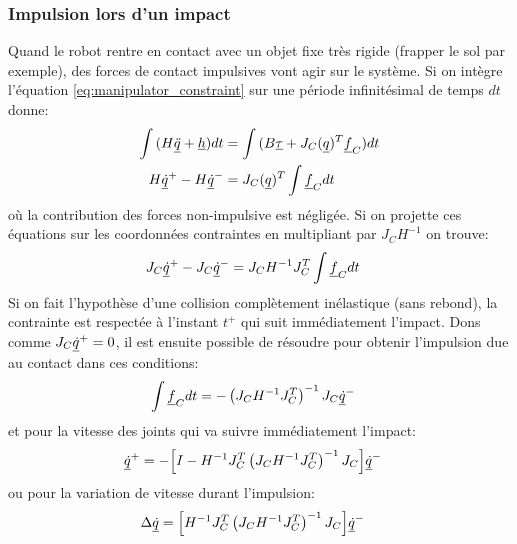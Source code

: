 \subsubsection{Impulsion lors d'un impact}
\label{sec:impact}
Quand le robot rentre en contact avec un objet fixe très rigide (frapper le sol par exemple), des forces de contact impulsives vont agir sur le système. Si on intègre l'équation \eqref{eq:manipulator_constraint} sur une période infinitésimal de temps $dt$ donne:
\begin{align}
\int{ ( H \underline{\ddot{q}} + \underline{h} ) dt } &= \int{ ( B \underline{\tau} + J_C( \underline{ q } )^T  \underline{f}_C ) dt } \\
H \underline{\dot{q}}^+ - H \underline{\dot{q}}^- &= J_C( \underline{ q } )^T  \int{  \underline{f}_C dt }
\label{eq:manipulator_impact}
\end{align}
où la contribution des forces non-impulsive est négligée. Si on projette ces équations sur les coordonnées contraintes en multipliant par $J_C H^{-1}$ on trouve:
\begin{align}
J_C \underline{\dot{q}}^+ - J_C \underline{\dot{q}}^- &= J_C H^{-1} J_C^T  \int{  \underline{f}_C dt }
\label{eq:manipulator_impact2}
\end{align}
Si on fait l'hypothèse d'une collision complètement inélastique (sans rebond), la contrainte est respectée à l'instant $t^+$ qui suit immédiatement l'impact. Dons comme $J_C \underline{\dot{q}}^+=0$, il est ensuite possible de résoudre pour obtenir l'impulsion due au contact dans ces conditions:
\begin{align}
\int{  \underline{f}_C dt } &= - \left( J_C H^{-1} J_C^T \right)^{-1}  J_C \underline{\dot{q}}^-
\label{eq:manipulator_impact_force}
\end{align}
et pour la vitesse des joints qui va suivre immédiatement l'impact:
\begin{align}
\underline{\dot{q}}^+ &= - \Big[ I - H^{-1} J_C^T \left( J_C H^{-1} J_C^T \right)^{-1} J_C \Big] \underline{\dot{q}}^-
\label{eq:manipulator_impact_velocity}
\end{align}
ou pour la variation de vitesse durant l'impulsion:
\begin{align}
\Delta \underline{\dot{q}} &=  \Big[ H^{-1} J_C^T \left( J_C H^{-1} J_C^T \right)^{-1} J_C \Big] \underline{\dot{q}}^-
\label{eq:manipulator_impact_velocity_delta}
\end{align}
